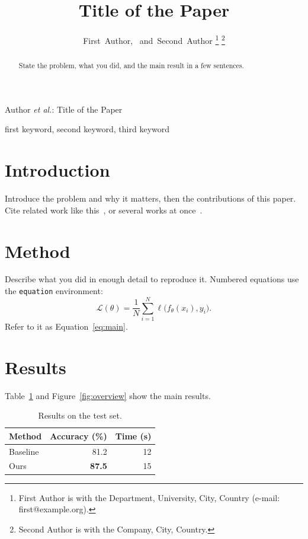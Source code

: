 \documentclass[10pt,journal,compsoc]{IEEEtran}
\begin{document}
\title{Title of the Paper}

\author{First~Author,~
        and~Second~Author%
\thanks{First Author is with the Department, University, City, Country (e-mail: first@example.org).}%
\thanks{Second Author is with the Company, City, Country.}}

%
{Author \MakeLowercase{\textit{et al.}}: Title of the Paper}

\maketitle

\begin{abstract}
State the problem, what you did, and the main result in a few sentences.
\end{abstract}

\begin{IEEEkeywords}
first keyword, second keyword, third keyword
\end{IEEEkeywords}

\section{Introduction}
\label{sec:intro}
Introduce the problem and why it matters, then the contributions of this
paper. Cite related work like this~\cite{he2016deep}, or several works at
once~\cite{he2016deep,lecun2015deep}.

\section{Method}
\label{sec:method}
Describe what you did in enough detail to reproduce it. Numbered equations use
the \texttt{equation} environment:
\begin{equation}
  \label{eq:main}
  \mathcal{L}(\theta) = \frac{1}{N} \sum_{i=1}^{N} \ell\bigl(f_\theta(x_i), y_i\bigr).
\end{equation}
Refer to it as Equation~\eqref{eq:main}.

\section{Results}
\label{sec:results}
Table~\ref{tab:results} and Figure~\ref{fig:overview} show the main results.

\begin{table}[htbp]
  \centering
  \caption{Results on the test set.}
  \label{tab:results}
  \begin{tabular}{lrr}
    \toprule
    Method & Accuracy (\%) & Time (s) \\
    \midrule
    Baseline & 81.2 & 12 \\
    Ours & \textbf{87.5} & 15 \\
    \bottomrule
  \end{tabular}
\end{table}
\end{document}
